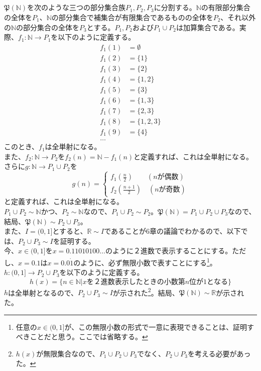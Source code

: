 \documentclass{jsarticle}
\begin{document}
\subsection{}
$\mathfrak{P}(\mathbb{N})$を次のような三つの部分集合族$P_1, P_2, P_3$に分割する。$\mathbb{N}$の有限部分集合の全体を$P_1$、$\mathbb{N}$の部分集合で補集合が有限集合であるものの全体を$P_2$、それ以外の$\mathbb{N}$の部分集合の全体を$P_3$とする。$P_1,P_2およびP_1 \cup P_2$は加算集合である。実際、$f_1:\mathbb{N}\to P_1$を以下のように定義する。
\begin{align*}
f_1(1)&=\emptyset\\
f_1(2)&=\{1\}\\
f_1(3)&=\{2\}\\
f_1(4)&=\{1,2\}\\
f_1(5)&=\{3\}\\
f_1(6)&=\{1,3\}\\
f_1(7)&=\{2,3\}\\
f_1(8)&=\{1,2,3\}\\
f_1(9)&=\{4\}\\
\dots
\end{align*}
このとき、$f_1$は全単射になる。\\
また、$f_2:\mathbb{N}\to P_2$を$f_2(n)=\mathbb{N}-f_1(n)$と定義すれば、これは全単射になる。\\
さらに$g:\mathbb{N}\to P_1 \cup P_2$を
\[g(n)=
\begin{cases}
f_1(\frac{n}{2})  \qquad(nが偶数)\\
f_2(\frac{n+1}{2})  \quad(nが奇数)
\end{cases}
\]
と定義すれば、これは全単射になる。\\
$P_1\cup P_2 \sim \mathbb{N}$かつ、$P_2\sim \mathbb{N}$なので、$P_1\cup P_2\sim P_2$。$\mathfrak{P}(\mathbb{N})=P_1\cup P_2 \cup P_3$なので、結局、$\mathfrak{P}(\mathbb{N})\sim P_2 \cup P_3$。\\
また、$I=(0,1]$とすると、$\mathbb{R}\sim I$であることが6章の議論でわかるので、以下では、$P_2\cup P_3 \sim I$を証明する。\\

今、$x\in(0,1]$を$x=0.11010100\dots$のように２進数で表示することにする。ただし、$x=0.1$は$x=0.0\dot{1}$のように、必ず無限小数で表すことにする\footnote{任意の$x\in(0,1]$が、この無限小数の形式で一意に表現できることは、証明すべきことだと思う。ここでは省略する。}。\\
$h:(0,1]\to P_2\cup P_3$を以下のように定義する。\\
\[h(x)=\{n\in\mathbb{N}|xを２進数表示したときの小数第n位が1となる\}\]
$h$は全単射となるので、$P_2\cup P_3 \sim I$が示された\footnote{$h(x)$が無限集合なので、$P_1\cup P_2\cup P_3$でなく、$ P_2\cup P_3$を考える必要があった。}。結局、$\mathfrak{P}(\mathbb{N})\sim\mathbb{R}$が示された。
\end{document}
